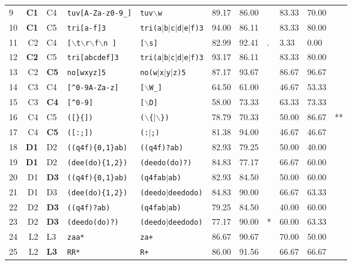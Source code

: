 \begin{table*}[ht]
\begin{tabular}{p{0.3cm}r@{ -- }lp{4cm}p{4cm}|p{0.8cm}p{0.8cm}p{0.6cm}|p{0.99cm}p{0.99cm}p{0.6cm}}
  9 & {\bf C1} & C4 & {\tt tuv[A-Za-z0-9\_]} & {\tt tuv$\backslash$w} & 89.17 & 86.00 &   & 83.33 & 70.00 &   \\ 
    10 & {\bf C1} & C5 & {\tt tri[a-f]3} & {\tt tri(a$|$b$|$c$|$d$|$e$|$f)3} & 94.00 & 86.11 &   & 83.33 & 80.00 &   \\ 
  11 & C2 & C4 & {\tt [$\backslash$t$\backslash$r$\backslash$f$\backslash$n ]} & {\tt [$\backslash$s]} & 82.99 & 92.41 & . & 3.33 & 0.00 &   \\ 
  12 & {\bf C2} & C5 & {\tt tri[abcdef]3} & {\tt tri(a$|$b$|$c$|$d$|$e$|$f)3} & 93.17 & 86.11 &   & 83.33 & 80.00 &   \\ 
  13 & C2 & {\bf C5} & {\tt no[wxyz]5} & {\tt no(w$|$x$|$y$|$z)5} & 87.17 & 93.67 &   & 86.67 & 96.67 &   \\ 
  14 & C3 & C4 & {\tt [\verb|^|0-9A-Za-z]} & {\tt [$\backslash$W\_]} & 64.50 & 61.00 &   & 46.67 & 53.33 &   \\ 
  15 & C3 & {\bf C4} & {\tt [\verb|^|0-9]} & {\tt [$\backslash$D]} & 58.00 & 73.33 &   & 63.33 & 73.33 &   \\ 
  16 & C4 & C5 & {\tt ([\}\{])} & {\tt ($\backslash$\{$|$$\backslash$\})} & 78.79 & 70.33 &   & 50.00 & 86.67 & ** \\ 
  17 & C4 & {\bf C5} & {\tt ([:;])} & {\tt (:$|$;)} & 81.38 & 94.00 &   & 46.67 & 46.67 &   \\ 
  \hline
  
  18 & {\bf D1} & D2 & {\tt ((q4f)\{0,1\}ab)} & {\tt ((q4f)?ab)} & 82.93 & 79.25 &   & 50.00 & 40.00 &   \\ 
  19 & {\bf D1} & D2 & {\tt (dee(do)\{1,2\})} & {\tt (deedo(do)?)} & 84.83 & 77.17 &   & 66.67 & 60.00 &   \\ 
  20 & D1 & {\bf D3} & {\tt ((q4f)\{0,1\}ab)} & {\tt (q4fab$|$ab)} & 82.93 & 84.50 &   & 50.00 & 60.00 &   \\ 
  21 & D1 & D3 & {\tt (dee(do)\{1,2\})} & {\tt (deedo$|$deedodo)} & 84.83 & 90.00 &   & 66.67 & 63.33 &   \\ 

  22 & D2 & {\bf D3} & {\tt ((q4f)?ab)} & {\tt (q4fab$|$ab)} & 79.25 & 84.50 &   & 40.00 & 60.00 &   \\ 
  23 & D2 & {\bf D3} & {\tt (deedo(do)?)} & {\tt (deedo$|$deedodo)} & 77.17 & 90.00 & * & 60.00 & 63.33 &   \\ 
  \hline
  
  24 & L2 & L3 & {\tt zaa*} & {\tt za+} & 86.67 & 90.67 &   & 70.00 & 50.00 &   \\ 
  25 & L2 & {\bf L3} & {\tt RR*} & {\tt R+} & 86.00 & 91.56 &   & 66.67 & 66.67 &   \\ 
  \hline
  

\end{tabular}
\end{table*}
